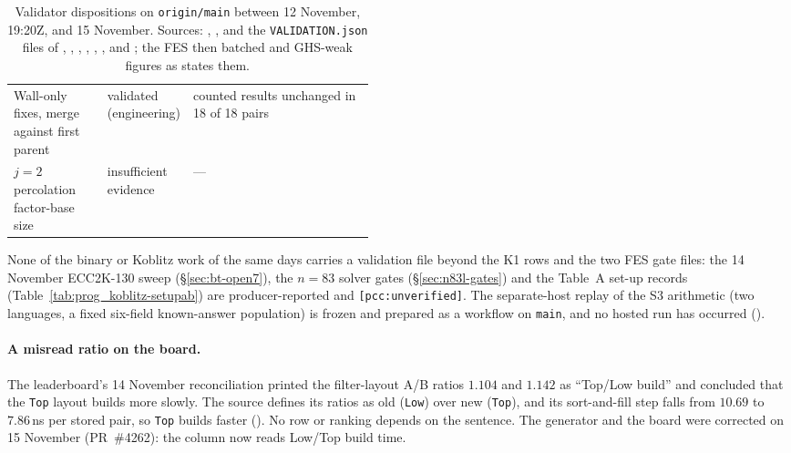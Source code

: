 \begin{table}[t]
\begin{tabularx}{\linewidth}{@{}>{\raggedright}p{0.26\linewidth}>{\raggedright}p{0.2\linewidth}>{\raggedright\arraybackslash}X@{}}
Wall-only fixes, merge against first parent & validated (engineering) & counted results unchanged in 18 of 18 pairs \\
$j=2$ percolation factor-base size & insufficient evidence & --- \\
\bottomrule
\end{tabularx}
\caption[]{Validator dispositions on \texttt{origin/main} between 12
November, 19:20Z, and 15 November. Sources:
,
,
 and the
\texttt{VALIDATION.json} files of
,
,
,
,
,
,
 and
; the FES
then batched and GHS-weak figures as  states
them.}
\label{tab:audit-nov}
\end{table}

None of the binary or Koblitz work of the same days carries a validation
file beyond the K1 rows and the two FES gate files: the 14 November
ECC2K-130 sweep (\S\ref{sec:bt-open7}), the $n=83$ solver gates
(\S\ref{sec:n83l-gates}) and the Table~A set-up records
(Table~\ref{tab:prog_koblitz-setupab}) are producer-reported and
\texttt{[pcc:unverified]}. The separate-host replay of the S3 arithmetic
(two languages, a fixed six-field known-answer population) is frozen and
prepared as a workflow on \texttt{main}, and no hosted run has occurred
().

\paragraph{A misread ratio on the board.} The leaderboard's 14 November
reconciliation printed the filter-layout A/B ratios $1.104$ and $1.142$ as
``Top/Low build'' and concluded that the \texttt{Top} layout builds more
slowly. The source defines its ratios as old (\texttt{Low}) over new
(\texttt{Top}), and its sort-and-fill step falls from $10.69$ to $7.86$\,ns
per stored pair, so \texttt{Top} builds faster
().
No row or ranking depends on the sentence. The generator and the board were
corrected on 15 November (PR~\#4262): the column now reads Low/Top build time.


